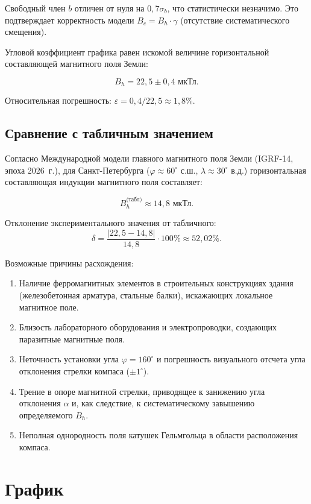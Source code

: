 Свободный член $b$ отличен от нуля на $0{,}7\sigma_b$, что статистически незначимо. Это подтверждает корректность модели $B_c = B_h \cdot \gamma$ (отсутствие систематического смещения).

Угловой коэффициент графика равен искомой величине горизонтальной составляющей магнитного поля Земли:

\[
\boxed{B_h = 22{,}5 \pm 0{,}4 \text{ мкТл}}.
\]

Относительная погрешность: $\varepsilon = 0{,}4 / 22{,}5 \approx 1{,}8\%$.

\subsection{Сравнение с табличным значением}

Согласно Международной модели главного магнитного поля Земли (IGRF-14, эпоха 2026~г.), для Санкт-Петербурга ($\varphi \approx 60^\circ$ с.ш., $\lambda \approx 30^\circ$ в.д.) горизонтальная составляющая индукции магнитного поля составляет:

\[
B_h^\text{(табл)} \approx 14{,}8 \text{ мкТл}.
\]

Отклонение экспериментального значения от табличного:
\[
\delta = \frac{|22{,}5 - 14{,}8|}{14{,}8} \cdot 100\% \approx 52{,}02\%.
\]

Возможные причины расхождения:
\begin{enumerate}
    \item Наличие ферромагнитных элементов в строительных конструкциях здания (железобетонная арматура, стальные балки), искажающих локальное магнитное поле.
    \item Близость лабораторного оборудования и электропроводки, создающих паразитные магнитные поля.
    \item Неточность установки угла $\varphi = 160^\circ$ и погрешность визуального отсчета угла отклонения стрелки компаса ($\pm 1^\circ$).
    \item Трение в опоре магнитной стрелки, приводящее к занижению угла отклонения $\alpha$ и, как следствие, к систематическому завышению определяемого $B_h$.
    \item Неполная однородность поля катушек Гельмгольца в области расположения компаса.
\end{enumerate}

\section{График}

